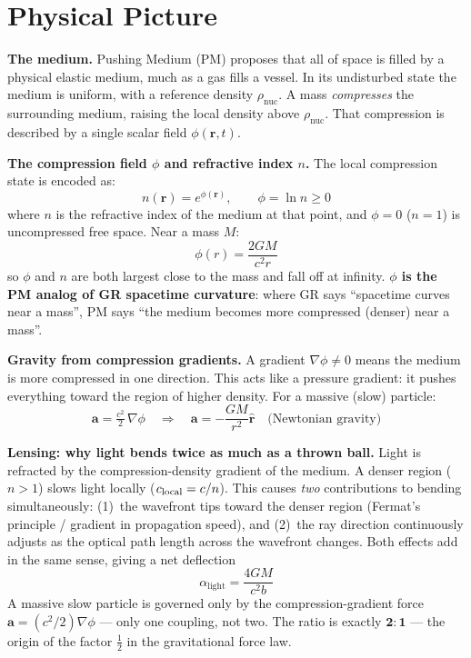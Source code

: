 \documentclass[10pt,twocolumn]{article}
\begin{document}

\section{Physical Picture}

\textbf{The medium.}
Pushing Medium (PM) proposes that all of space is filled by a physical
elastic medium, much as a gas fills a vessel.  In its undisturbed state the
medium is uniform, with a reference density $\rho_{\mathrm{nuc}}$.  A mass
\emph{compresses} the surrounding medium, raising the local density above
$\rho_{\mathrm{nuc}}$.  That compression is described by a single scalar
field $\phi(\mathbf{r},t)$.

\textbf{The compression field $\phi$ and refractive index $n$.}
The local compression state is encoded as:
\[
  n(\mathbf{r}) = e^{\phi(\mathbf{r})}, \qquad \phi = \ln n \geq 0
\]
where $n$ is the refractive index of the medium at that point, and $\phi = 0$
($n=1$) is uncompressed free space.  Near a mass $M$:
\[
  \phi(r) = \frac{2GM}{c^2 r}
\]
so $\phi$ and $n$ are both largest close to the mass and fall off at infinity.
\textbf{$\phi$ is the PM analog of GR spacetime curvature}: where GR says
``spacetime curves near a mass'', PM says ``the medium becomes more compressed
(denser) near a mass''.

\textbf{Gravity from compression gradients.}
A gradient $\nabla\phi \neq 0$ means the medium is more compressed in one
direction.  This acts like a pressure gradient: it pushes everything toward
the region of higher density.  For a massive (slow) particle:
\[
  \mathbf{a} = \tfrac{c^2}{2}\,\nabla\phi
  \quad \Longrightarrow \quad
  \mathbf{a} = -\frac{GM}{r^2}\hat{\mathbf{r}} \quad \text{(Newtonian gravity)}
\]

\textbf{Lensing: why light bends twice as much as a thrown ball.}
Light is refracted by the compression-density gradient of the medium.
A denser region ($n > 1$) slows light locally ($c_{\rm local} = c/n$).
This causes \emph{two} contributions to bending simultaneously:
(1)~the wavefront tips toward the denser region (Fermat's principle /
gradient in propagation speed), and
(2)~the ray direction continuously adjusts as the optical path length
across the wavefront changes.
Both effects add in the same sense, giving a net deflection
\[
  \alpha_{\mathrm{light}} = \frac{4GM}{c^2 b}
\]
A massive slow particle is governed only by the compression-gradient
force $\mathbf{a} = (c^2/2)\nabla\phi$ — only one coupling, not two.
The ratio is exactly $\mathbf{2:1}$ — the origin of the
factor $\tfrac{1}{2}$ in the gravitational force law.
\end{document}
